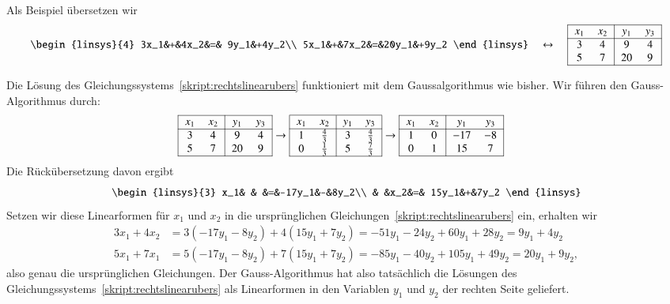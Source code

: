 \begin{beispiel}
Als Beispiel übersetzen wir
\begin{equation}
\begin{linsys}{4}
3x_1&+&4x_2&=& 9y_1&+4y_2\\
5x_1&+&7x_2&=&20y_1&+9y_2
\end{linsys}
\quad\leftrightarrow\quad
\begin{tabular}{| >{$}c<{$} >{$}c<{$}| >{$}c<{$} >{$}c<{$}|}
\hline
x_1&x_2&y_1&y_3\\
\hline
3&4&9&4\\
5&7&20&9\\
\hline
\end{tabular}
\label{skript:rechtslinearubers}
\end{equation}

Die Lösung des Gleichungssystems~\eqref{skript:rechtslinearubers} 
funktioniert mit dem Gaussalgorithmus wie bisher.
Wir führen den Gauss-Algorithmus durch:
\begin{align*}
\begin{tabular}{| >{$}c<{$} >{$}c<{$}| >{$}c<{$} >{$}c<{$}|}
\hline
x_1&x_2&y_1&y_3\\
\hline
3&4&9&4\\
5&7&20&9\\
\hline
\end{tabular}
&\rightarrow
\begin{tabular}{| >{$}c<{$} >{$}c<{$}| >{$}c<{$} >{$}c<{$}|}
\hline
x_1&x_2&y_1&y_3\\
\hline
1&\frac{4}{3}&3&\frac{4}{3}\\
0&\frac{1}{3}&5&\frac{7}{3}\\
\hline
\end{tabular}
\rightarrow
\begin{tabular}{| >{$}c<{$} >{$}c<{$}| >{$}c<{$} >{$}c<{$}|}
\hline
x_1&x_2&y_1&y_3\\
\hline
1&0&-17&-8\\
0&1& 15& 7\\
\hline
\end{tabular}
\end{align*}
Die Rückübersetzung davon ergibt
\[
\begin{linsys}{3}
x_1& &   &=&-17y_1&-&8y_2\\
   & &x_2&=& 15y_1&+&7y_2
\end{linsys}
\]
Setzen wir diese Linearformen für $x_1$ und $x_2$ in die ursprünglichen
Gleichungen~\eqref{skript:rechtslinearubers} ein, erhalten
wir
\begin{align*}
3x_1+4x_2
&=
3(-17y_1-8y_2)+4(15y_1+7y_2)
=
-51y_1-24y_2+60y_1+28y_2
=
9y_1+4y_2
\\
5x_1+7x_1
&=
5(-17y_1-8y_2)+7(15y_1+7y_2)
=
-85y_1-40y_2+105y_1+49y_2
=
20y_1+9y_2,
\end{align*}
also genau die ursprünglichen Gleichungen.
Der Gauss-Algorithmus hat also tatsächlich die Lösungen des
Gleichungssystems~\eqref{skript:rechtslinearubers} als
Linearformen in den Variablen $y_1$ und $y_2$ der rechten Seite
geliefert.
\end{beispiel}

